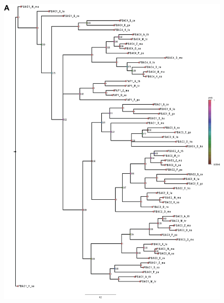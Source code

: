 \clearpage
\begin{figure}[ht]
	\centering
	\includegraphics[width=\columnwidth]{Proteasome/tree1.png}
	{}
	\label{fig:tree1}
\end{figure}


